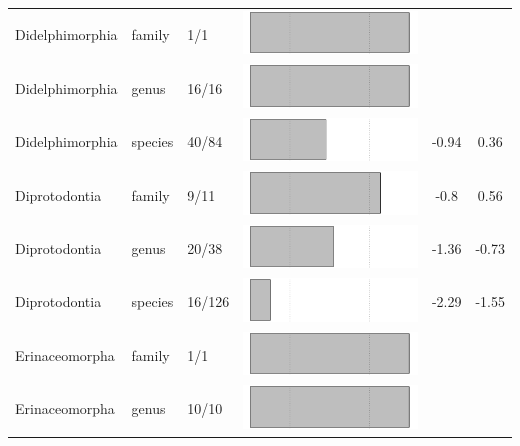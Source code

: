 \begin{longtable}{lL{1.8cm}C{2cm}lcc}
  Didelphimorphia & family & 1/1 & \includegraphics[width=0.20\linewidth, height=0.05\linewidth]{Missing_mammals/Table_figures/bar22.pdf} &   &   \\ 
  Didelphimorphia & genus & 16/16 & \includegraphics[width=0.20\linewidth, height=0.05\linewidth]{Missing_mammals/Table_figures/bar23.pdf} &   &   \\ 
  Didelphimorphia & species & 40/84 & \includegraphics[width=0.20\linewidth, height=0.05\linewidth]{Missing_mammals/Table_figures/bar24.pdf} & -0.94 & 0.36 \\ 
  Diprotodontia & family & 9/11 & \includegraphics[width=0.20\linewidth, height=0.05\linewidth]{Missing_mammals/Table_figures/bar25.pdf} & -0.8 & 0.56 \\ 
  Diprotodontia & genus & 20/38 & \includegraphics[width=0.20\linewidth, height=0.05\linewidth]{Missing_mammals/Table_figures/bar26.pdf} & -1.36 & -0.73 \\ 
  Diprotodontia & species & 16/126 & \includegraphics[width=0.20\linewidth, height=0.05\linewidth]{Missing_mammals/Table_figures/bar27.pdf} & -2.29 & -1.55 \\ 
  Erinaceomorpha & family & 1/1 & \includegraphics[width=0.20\linewidth, height=0.05\linewidth]{Missing_mammals/Table_figures/bar28.pdf} &   &   \\ 
  Erinaceomorpha & genus & 10/10 & \includegraphics[width=0.20\linewidth, height=0.05\linewidth]{Missing_mammals/Table_figures/bar29.pdf} &   &   \\ 

\end{longtable}
